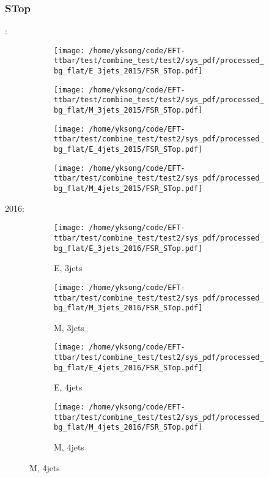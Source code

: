 \documentclass{beamer}
\begin{document}
\begin{frame}
\frametitle{STop}
\fontsize{5}{1}:
\begin{figure}
\centering
\begin{subfigure}[b]{0.24\textwidth}
\texttt{[image: /home/yksong/code/EFT-ttbar/test/combine\_test/test2/sys\_pdf/processed\_bg\_flat/E\_3jets\_2015/FSR\_STop.pdf]}
\end{subfigure}
\begin{subfigure}[b]{0.24\textwidth}
\texttt{[image: /home/yksong/code/EFT-ttbar/test/combine\_test/test2/sys\_pdf/processed\_bg\_flat/M\_3jets\_2015/FSR\_STop.pdf]}
\end{subfigure}
\begin{subfigure}[b]{0.24\textwidth}
\texttt{[image: /home/yksong/code/EFT-ttbar/test/combine\_test/test2/sys\_pdf/processed\_bg\_flat/E\_4jets\_2015/FSR\_STop.pdf]}
\end{subfigure}
\begin{subfigure}[b]{0.24\textwidth}
\texttt{[image: /home/yksong/code/EFT-ttbar/test/combine\_test/test2/sys\_pdf/processed\_bg\_flat/M\_4jets\_2015/FSR\_STop.pdf]}
\end{subfigure}
\end{figure}
2016:
\begin{figure}
\centering
\begin{subfigure}[b]{0.24\textwidth}
\texttt{[image: /home/yksong/code/EFT-ttbar/test/combine\_test/test2/sys\_pdf/processed\_bg\_flat/E\_3jets\_2016/FSR\_STop.pdf]}
\captionsetup{font=tiny}
\caption{E, 3jets}
\end{subfigure}
\begin{subfigure}[b]{0.24\textwidth}
\texttt{[image: /home/yksong/code/EFT-ttbar/test/combine\_test/test2/sys\_pdf/processed\_bg\_flat/M\_3jets\_2016/FSR\_STop.pdf]}
\captionsetup{font=tiny}
\caption{M, 3jets}
\end{subfigure}
\begin{subfigure}[b]{0.24\textwidth}
\texttt{[image: /home/yksong/code/EFT-ttbar/test/combine\_test/test2/sys\_pdf/processed\_bg\_flat/E\_4jets\_2016/FSR\_STop.pdf]}
\captionsetup{font=tiny}
\caption{E, 4jets}
\end{subfigure}
\begin{subfigure}[b]{0.24\textwidth}
\texttt{[image: /home/yksong/code/EFT-ttbar/test/combine\_test/test2/sys\_pdf/processed\_bg\_flat/M\_4jets\_2016/FSR\_STop.pdf]}
\captionsetup{font=tiny}
\caption{M, 4jets}
\end{subfigure}
\end{figure}
\end{frame}
\end{document}
